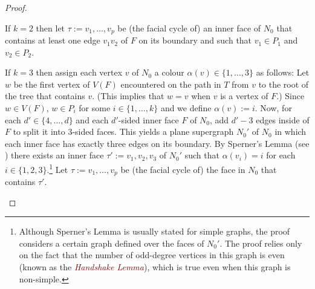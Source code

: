 \documentclass{patmorin}
\theoremstyle{plain}
\theoremstyle{definition}
\newcommand{\defin}[1]{\textcolor{Maroon}{\emph{#1}}}
\begin{document}
\begin{proof}
\begin{compactenum}
    \item If $k= 2$ then let $\tau:=v_1,\ldots,v_p$ be (the facial cycle of) an inner face of $N_0$ that contains at least one edge $v_1v_2$ of $F$ on its boundary and such that $v_1\in P_1$ and $v_2\in P_2$.

    \item If $k=3$ then assign each vertex $v$ of $N_0$ a colour $\alpha(v)\in\{1,\ldots,3\}$ as follows:  Let $w$ be the first vertex of $V(F)$ encountered on the path in $T$ from $v$ to the root of the tree that contains $v$.  (This implies that $w=v$ when $v$ is a vertex of $F$.)  Since $w\in V(F)$, $w\in P_i$ for some $i\in\{1,\ldots,k\}$ and we define $\alpha(v):=i$.  Now, for each $d'\in\{4,\ldots,d\}$ and each $d'$-sided inner face $F$ of $N_0$, add $d'-3$ edges inside of $F$ to split it into $3$-sided faces.  This yields a plane supergraph $N_0'$ of $N_0$ in which each inner face has exactly three edges on its boundary. By Sperner's Lemma (see \citep{Proofs4}) there exists an inner face $\tau':=v_1,v_2,v_3$ of $N_0'$ such that $\alpha(v_i)=i$ for each $i\in\{1,2,3\}$.\footnote{Although Sperner's Lemma is usually stated for simple graphs, the proof considers a certain graph defined over the faces of $N_0'$.  The proof relies only on the fact that the number of odd-degree vertices in this graph is even (known as the \defin{Handshake Lemma}), which is true even when this graph is non-simple.}  Let $\tau:=v_1,\ldots,v_p$ be (the facial cycle of) the face in $N_0$ that contains $\tau'$.
  \end{compactenum}


\end{proof}
\end{document}
